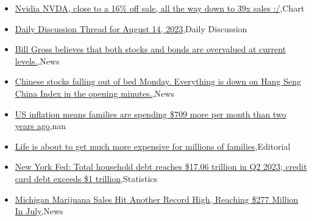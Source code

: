 \documentclass{article}%
\begin{document}
%
\begin{itemize}%
\item%
\href{https://reddit.com/r/wallstreetbets/comments/15qqvsm/nvidia\_nvda\_close\_to\_a\_16\_off\_sale\_all\_the\_way/}{Nvidia NVDA, close to a 16\% off sale, all the way down to 39x sales :/},Chart%
\item%
\href{https://reddit.com/r/wallstreetbets/comments/15qqddy/daily\_discussion\_thread\_for\_august\_14\_2023/}{Daily Discussion Thread for August 14, 2023},Daily Discussion%
\item%
\href{https://reddit.com/r/wallstreetbets/comments/15qpife/bill\_gross\_believes\_that\_both\_stocks\_and\_bonds/}{Bill Gross believes that both stocks and bonds are overvalued at current levels.},News%
\item%
\href{https://reddit.com/r/StockMarket/comments/15qpafm/chinese\_stocks\_falling\_out\_of\_bed\_monday/}{Chinese stocks falling out of bed Monday. Everything is down on Hang Seng China Index in the opening minutes.},News%
\item%
\href{https://reddit.com/r/Economics/comments/15qhqib/us\_inflation\_means\_families\_are\_spending\_709\_more/}{US inflation means families are spending \$709 more per month than two years ago},nan%
\item%
\href{https://reddit.com/r/Economics/comments/15qfox9/life\_is\_about\_to\_get\_much\_more\_expensive\_for/}{Life is about to get much more expensive for millions of families},Editorial%
\item%
\href{https://reddit.com/r/Economics/comments/15q63yn/new\_york\_fed\_total\_household\_debt\_reaches\_1706/}{New York Fed: Total household debt reaches \$17.06 trillion in Q2 2023; credit card debt exceeds \$1 trillion},Statistics%
\item%
\href{https://reddit.com/r/Economics/comments/15q2ki7/michigan\_marijuana\_sales\_hit\_another\_record\_high/}{Michigan Marijuana Sales Hit Another Record High, Reaching \$277 Million In July},News%
\end{itemize}%
\end{document}
